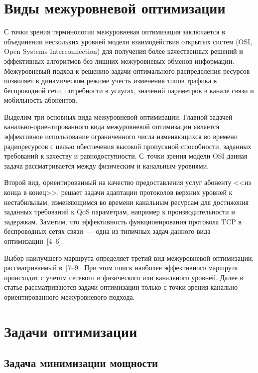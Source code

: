 \begin{multicols}{2}
\section{Виды межуровневой оптимизации}

  С точки зрения терминологии межуровневая оптимизация заключается в объединении 
нескольких уровней модели взаимодействия открытых сис\-тем (OSI, Open Systems 
Interconnection) для полу\-чения более качественных решений и \mbox{эффективных} алгоритмов 
без лишних межуровневых обменов информа\-ции. Межуровневый подход к решению 
задачи оптимального распределения ресурсов позволяет в динамическом режиме учесть 
изменения типов трафика в беспроводной сети, потребности в услугах, значений 
параметров в канале связи и мобильность абонентов.
  
  Выделим три основных вида межуровневой оптимизации. Главной задачей 
  ка\-наль\-но-ориен\-ти\-ро\-ван\-но\-го вида межуровневой оптимизации является 
эффективное использование ограниченного числа изменяющихся во времени 
радиоресурсов с целью обеспечения высокой пропускной способности, заданных 
требований к качеству и равнодоступности. С~точки зрения модели OSI данная задача 
рассматривается между физическим и канальным уровнями.
  
  Второй вид, ориентированный на качество пред\-остав\-ле\-ния услуг абоненту <<из конца 
в конец>>, решает задачи адаптации протоколов верхних уровней к нестабильным, 
изменяющимся во времени канальным ресурсам для достижения заданных требований к 
QoS параметрам, например к производительности и задержкам. Заметим, что 
эффективность функционирования протокола TCP в беспроводных сетях связи~--- одна из 
типичных задач данного вида оптимизации~[4--6].
  
  Выбор наилучшего маршрута определяет третий вид межуровневой оптимизации, 
рассматриваемый в~[7--9]. При этом поиск наиболее эффективного маршрута происходит 
с учетом сетевого и физического или канального уровней. Далее в статье рассматриваются 
задачи оптимизации только с точки зрения ка\-наль\-но-ориен\-ти\-ро\-ван\-но\-го 
межуровневого подхода.

\section{Задачи оптимизации}

\subsection{Задача минимизации мощности}
  

\end{multicols}
